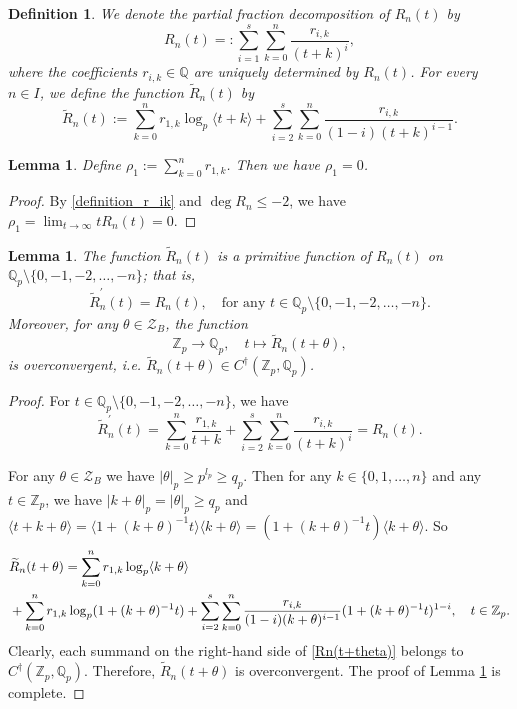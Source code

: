 \documentclass[12pt]{article}
\newtheorem{lemma}[theorem]{Lemma}
\newtheorem{definition}[theorem]{Definition}
\numberwithin{equation}{section}
\begin{document}
\begin{definition}
We denote the partial fraction decomposition of $R_n(t)$ by
	\begin{equation}\label{definition_r_ik}
		R_n(t) =: \sum_{i=1}^{s}\sum_{k=0}^{n} \frac{r_{i,k}}{(t+k)^i},
	\end{equation} 
	where the coefficients $r_{i,k} \in \mathbb{Q}$ are uniquely determined by $R_n(t)$. For every $n \in I$, we define the function $\widetilde{R}_n(t)$ by
	\begin{equation}\label{definition_widetildeR_n}
	 \widetilde{R}_n(t) := \sum_{k=0}^{n} r_{1,k}\log_p\langle t+k \rangle + \sum_{i=2}^{s}\sum_{k=0}^{n} \frac{r_{i,k}}{(1-i)(t+k)^{i-1}}. 
	 \end{equation}
\end{definition}

\begin{lemma}\label{rho_1_is_zero}
Define $\rho_1 := \sum_{k=0}^{n} r_{1,k}$. Then we have $\rho_1 = 0$. 
\end{lemma}
\begin{proof}
By \eqref{definition_r_ik} and $\deg R_n \leqslant -2$, we have $\rho_1 = \lim_{t \to \infty} tR_n(t) = 0$.
\end{proof}

\begin{lemma}\label{lemma_primitive}
	The function $\widetilde{R}_n(t)$ is a primitive function of $R_n(t)$ on $\mathbb{Q}_p \setminus \{0,-1,-2,\ldots,-n\}$; that is,
	\[ \widetilde{R}_n^{\prime}(t) = R_n(t), \quad\text{for any~} t \in \mathbb{Q}_p \setminus \{0,-1,-2,\ldots,-n\}. \]
	Moreover, for any $\theta \in \mathcal{Z}_B$, the function
	\[ \mathbb{Z}_p\to \mathbb{Q}_p, \quad t\mapsto \widetilde{R}_n(t +\theta),  \]
	is overconvergent, i.e. $\widetilde{R}_n(t +\theta)\in C^\dagger(\mathbb{Z}_p,\mathbb{Q}_p)$.
\end{lemma}

\begin{proof}
For $t \in \mathbb{Q}_p \setminus \{0,-1,-2,\ldots,-n\}$, we have
\[ \widetilde{R}_n^{\prime}(t) = \sum_{k=0}^{n} \frac{r_{1,k}}{t+k} + \sum_{i=2}^{s}\sum_{k=0}^{n} \frac{r_{i,k}}{(t+k)^i} = R_n(t). \]

For any $\theta \in \mathcal{Z}_B$ we have $|\theta|_p \geqslant p^{l_p} \geqslant q_p$.  Then for any $k \in \{0,1,\ldots,n\}$ and any $t \in \mathbb{Z}_p$, we have $|k+\theta|_p = |\theta|_p \geqslant q_p$ and  $\langle t+k+\theta \rangle = \langle 1 + (k+\theta)^{-1}t\rangle\langle k+\theta\rangle = (1+(k+\theta)^{-1}t)\langle k+\theta \rangle$. So 
\begin{align}
	&\widetilde{R}_n(t+\theta) = \sum_{k=0}^{n} r_{1,k}\log_p\langle k+\theta \rangle \notag\\
	&+ \sum_{k=0}^{n} r_{1,k}\log_p(1+(k+\theta)^{-1}t) + \sum_{i=2}^{s}\sum_{k=0}^{n} \frac{r_{i,k}}{(1-i)(k+\theta)^{i-1}}(1+(k+\theta)^{-1}t)^{1-i}, \quad t \in \mathbb{Z}_p .\label{Rn(t+theta)}
\end{align} 
Clearly, each summand on the right-hand side of \eqref{Rn(t+theta)} belongs to $C^\dagger(\mathbb{Z}_p,\mathbb{Q}_p)$. Therefore, $\widetilde{R}_n(t+\theta)$ is overconvergent. The proof of Lemma \ref{lemma_primitive} is complete.
\end{proof}
\end{document}
